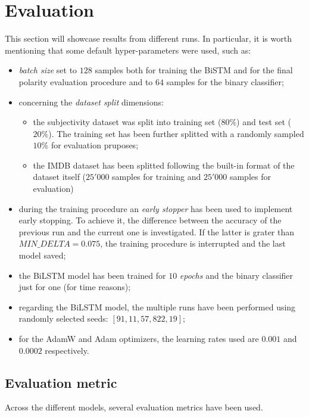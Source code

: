 
\section{Evaluation}
\label{sec:eval}
This section will showcase results from different runs. In particular, it is worth mentioning that some default hyper-parameters were used, such as:
\begin{itemize}
    \item \textit{batch size} set to $128$ samples both for training the BiSTM and for the final polarity evaluation procedure and to $64$ 
        samples for the  binary classifier;
    \item concerning the \textit{dataset split} dimensions:
        \begin{itemize}
            \item the subjectivity dataset was split into training set ($80\%$) and test set ($20\%$). The training set has been further splitted 
            with a  randomly sampled $10\%$ for evaluation pruposes;
            \item the IMDB dataset has been splitted following the built-in format of the dataset itself ($25'000$ samples for training
            and $25'000$ samples for evaluation)
        \end{itemize}
    \item during the training procedure an \textit{early stopper} has been used to implement early stopping. To achieve it, the 
        difference between the accuracy of the previous run and the current one is investigated. If the latter is grater than $MIN\_DELTA=0.075$, 
        the training procedure is interrupted and the last model saved;
    \item the BiLSTM model has been trained for $10$ \textit{epochs} and the binary classifier just for one (for time reasons);
    \item regarding the BiLSTM model, the multiple runs have been performed using  randomly selected seeds: $[91, 11, 57, 822, 19]$;
    \item for the AdamW and Adam optimizers, the learning rates used are $0.001$ and $0.0002$ respectively. 
\end{itemize}


\subsection{Evaluation metric}
\label{subsec:metric}
Across the different models, several evaluation metrics have been used. 
\vspace{-1.0em}
